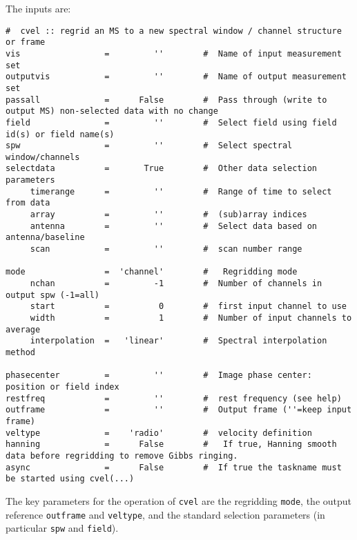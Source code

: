 The inputs are:
\small
\begin{verbatim}
#  cvel :: regrid an MS to a new spectral window / channel structure or frame
vis                 =         ''        #  Name of input measurement set
outputvis           =         ''        #  Name of output measurement set
passall             =      False        #  Pass through (write to output MS) non-selected data with no change
field               =         ''        #  Select field using field id(s) or field name(s)
spw                 =         ''        #  Select spectral window/channels
selectdata          =       True        #  Other data selection parameters
     timerange      =         ''        #  Range of time to select from data
     array          =         ''        #  (sub)array indices
     antenna        =         ''        #  Select data based on antenna/baseline
     scan           =         ''        #  scan number range

mode                =  'channel'        #   Regridding mode
     nchan          =         -1        #  Number of channels in output spw (-1=all)
     start          =          0        #  first input channel to use
     width          =          1        #  Number of input channels to average
     interpolation  =   'linear'        #  Spectral interpolation method

phasecenter         =         ''        #  Image phase center: position or field index
restfreq            =         ''        #  rest frequency (see help)
outframe            =         ''        #  Output frame (''=keep input frame)
veltype             =    'radio'        #  velocity definition
hanning             =      False        #   If true, Hanning smooth data before regridding to remove Gibbs ringing.
async               =      False        #  If true the taskname must be started using cvel(...)

\end{verbatim}
\normalsize

The key parameters for the operation of {\tt cvel} are the regridding
{\tt mode}, the output reference {\tt outframe} and {\tt veltype}, and
the standard selection parameters (in particular {\tt spw} and {\tt field}).

